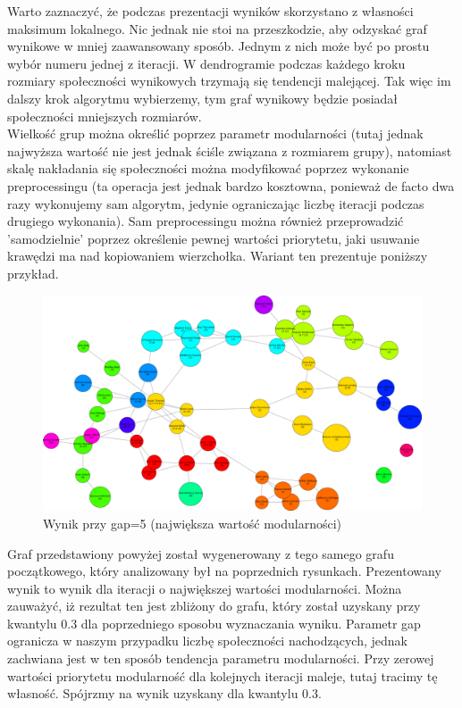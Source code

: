\documentclass{article}
\begin{document}
Warto zaznaczyć, że podczas prezentacji wyników skorzystano z własności maksimum lokalnego. Nic jednak nie stoi na przeszkodzie, aby odzyskać graf wynikowe w mniej zaawansowany sposób. Jednym z nich może być po prostu wybór numeru jednej z iteracji. W dendrogramie podczas każdego kroku rozmiary społeczności wynikowych trzymają się tendencji malejącej. Tak więc im dalszy krok algorytmu wybierzemy, tym graf wynikowy będzie posiadał społeczności mniejszych rozmiarów. \\

Wielkość grup można określić poprzez parametr modularności (tutaj jednak najwyższa wartość nie jest jednak ściśle związana z rozmiarem grupy), natomiast skalę nakładania się społeczności można modyfikować poprzez wykonanie preprocessingu (ta operacja jest jednak bardzo kosztowna, ponieważ de facto dwa razy wykonujemy sam algorytm, jedynie ograniczając liczbę iteracji podczas drugiego wykonania). Sam preprocessingu można również przeprowadzić 'samodzielnie' poprzez określenie pewnej wartości priorytetu, jaki usuwanie krawędzi ma nad kopiowaniem wierzchołka. Wariant ten prezentuje poniższy przykład.\\

\begin{figure}[H]
\centering
\includegraphics[width=\textwidth]{images/is-sample-4.png}
\caption{Wynik przy gap=5 (największa wartość modularności)}
\end{figure}

Graf przedstawiony powyżej został wygenerowany z tego samego grafu początkowego, który analizowany był na poprzednich rysunkach. Prezentowany wynik to wynik dla iteracji o największej wartości modularności. Można zauważyć, iż rezultat ten jest zbliżony do grafu, który został uzyskany przy kwantylu 0.3 dla poprzedniego sposobu wyznaczania wyniku. Parametr gap ogranicza w naszym przypadku liczbę społeczności nachodzących, jednak zachwiana jest w ten sposób tendencja parametru modularności. Przy zerowej wartości priorytetu modularność dla kolejnych iteracji maleje, tutaj tracimy tę własność. Spójrzmy na wynik uzyskany dla kwantylu 0.3.
\end{document}
